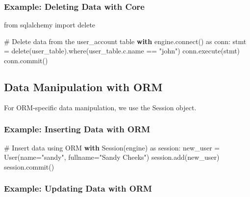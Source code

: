 \documentclass[
  letterpaper,
  DIV=11,
  numbers=noendperiod]{scrreprt}
\newenvironment{Shaded}{\begin{snugshade}}{\end{snugshade}}
\newcommand{\CommentTok}[1]{\textcolor[rgb]{0.37,0.37,0.37}{#1}}
\newcommand{\ControlFlowTok}[1]{\textcolor[rgb]{0.00,0.23,0.31}{\textbf{#1}}}
\newcommand{\ExtensionTok}[1]{\textcolor[rgb]{0.00,0.23,0.31}{#1}}
\newcommand{\ImportTok}[1]{\textcolor[rgb]{0.00,0.46,0.62}{#1}}
\newcommand{\NormalTok}[1]{\textcolor[rgb]{0.00,0.23,0.31}{#1}}
\newcommand{\OperatorTok}[1]{\textcolor[rgb]{0.37,0.37,0.37}{#1}}
\newcommand{\StringTok}[1]{\textcolor[rgb]{0.13,0.47,0.30}{#1}}
\begin{document}
\subsubsection{Example: Deleting Data with
Core}\label{example-deleting-data-with-core}

\begin{Shaded}
\begin{Highlighting}[]
\ImportTok{from}\NormalTok{ sqlalchemy }\ImportTok{import}\NormalTok{ delete}

\CommentTok{\# Delete data from the user\_account table}
\ControlFlowTok{with}\NormalTok{ engine.}\ExtensionTok{connect}\NormalTok{() }\ImportTok{as}\NormalTok{ conn:}
\NormalTok{    stmt }\OperatorTok{=}\NormalTok{ delete(user\_table).where(user\_table.c.name }\OperatorTok{==} \StringTok{"john"}\NormalTok{)}
\NormalTok{    conn.execute(stmt)}
\NormalTok{    conn.commit()}
\end{Highlighting}
\end{Shaded}

\subsection{Data Manipulation with
ORM}\label{data-manipulation-with-orm}

For ORM-specific data manipulation, we use the Session object.

\subsubsection{Example: Inserting Data with
ORM}\label{example-inserting-data-with-orm}

\begin{Shaded}
\begin{Highlighting}[]
\CommentTok{\# Insert data using ORM}
\ControlFlowTok{with}\NormalTok{ Session(engine) }\ImportTok{as}\NormalTok{ session:}
\NormalTok{    new\_user }\OperatorTok{=}\NormalTok{ User(name}\OperatorTok{=}\StringTok{"sandy"}\NormalTok{, fullname}\OperatorTok{=}\StringTok{"Sandy Cheeks"}\NormalTok{)}
\NormalTok{    session.add(new\_user)}
\NormalTok{    session.commit()}
\end{Highlighting}
\end{Shaded}

\subsubsection{Example: Updating Data with
ORM}\label{example-updating-data-with-orm}
\end{document}
